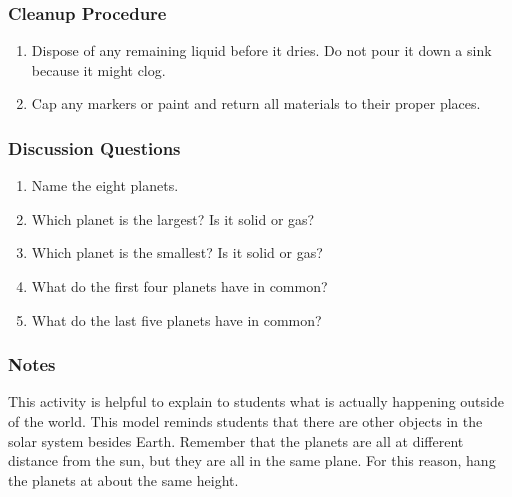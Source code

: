 \subsubsection*{Cleanup Procedure}
\begin{enumerate}
\item{Dispose of any remaining liquid before it dries. Do not pour it down a sink because it might clog.}
\item{Cap any markers or paint and return all materials to their proper places.}
\end{enumerate}

\subsubsection*{Discussion Questions}
\begin{enumerate}
\item{Name the eight planets.}
\item{Which planet is the largest? Is it solid or gas?}
\item{Which planet is the smallest? Is it solid or gas?}
\item{What do the first four planets have in common?}
\item{What do the last five planets have in common?}
\end{enumerate}

\subsubsection*{Notes}
This activity is helpful to explain to students what is actually
happening outside of the world. This model reminds students that there are other objects in the solar system besides Earth. Remember that the planets are all at different distance from the sun, but they are all in the same plane. For this reason, hang the planets at about the same height.






